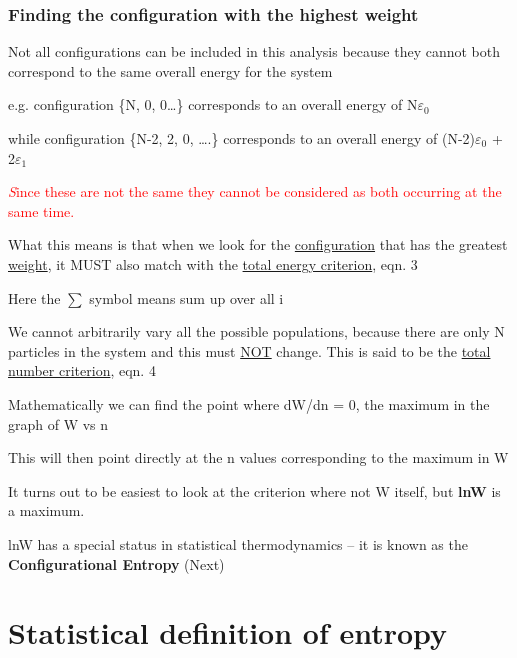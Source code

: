 \documentclass[ignorenonframetext]{beamer}
\begin{document}
\begin{frame}[allowframebreaks=0.7]
\frametitle{Finding the configuration with the highest weight}
Not all configurations can be included in this analysis because they cannot both correspond to the same overall energy for the system
 
e.g. configuration \{N, 0, 0…\} corresponds to an overall energy of N\(\varepsilon_0\)
 
while configuration \{N-2, 2, 0, ….\} corresponds to an overall energy of (N-2)\(\varepsilon_0\) + 2\(\varepsilon_1\)
 
\medskip \textcolor{red}{\textit Since these are not the same they cannot be considered as both occurring at the same time.}
 
What this means is that when we look for the \underline{configuration} that has the greatest \underline{weight}, it MUST also match with the \underline{total energy criterion}, eqn. 3

\begin{center}
\end{center}

Here the \(\sum\) symbol means sum up over all i  

\medskip We cannot arbitrarily vary all the possible populations, because there are only N particles in the system and this must \underline{NOT} change. This is said to be the \underline{total number criterion}, eqn. 4  
\begin{center}
\end{center}  

Mathematically we can find the point where dW/dn = 0, the maximum in the graph of W vs n  

\medskip This will then point directly at the n values corresponding to the maximum in W

\medskip It turns out to be easiest to look at the criterion where not W itself, but \textbf{lnW} is a maximum.

\medskip lnW has a special status in statistical thermodynamics -- it is known as the \textbf{Configurational Entropy} (Next)
\end{frame}

\section{Statistical definition of entropy}
\end{document}
